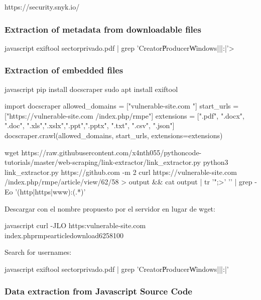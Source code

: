 \documentclass[letterpaper,12pt]{extarticle}
\begin{document}
https://security.snyk.io/



\subsubsection{Extraction of metadata from downloadable files}

\begin{sourcecode}{javascript}
exiftool sectorprivado.pdf | grep 'Creator\|Producer\|Windows|\Linux|\OS|\C:|\http'>
\end{sourcecode}

\subsubsection{Extraction of embedded files}

\begin{sourcecode}{javascript}
pip install docscraper 
sudo apt install exiftool


import docscraper 
allowed_domains = ["vulnerable-site.com "]
start_urls = ["https://vulnerable-site.com /index.php/rmpe"]
extensions = [".pdf", ".docx", ".doc", ".xls",".xslx",".ppt",".pptx", ".txt", ".csv", ".json"]
docscraper.crawl(allowed_domains, start_urls, extensions=extensions)
\end{sourcecode}

\begin{sourcecode}
wget https://raw.githubusercontent.com/x4nth055/pythoncode-tutorials/master/web-scraping/link-extractor/link_extractor.py
python3 link_extractor.py https://github.com -m 2
curl https://vulnerable-site.com /index.php/rmpe/article/view/62/58 > output && cat output | tr '";>' '\n' | grep -Eo '(http|https|www):(.*)'
\end{sourcecode}

Descargar con el nombre propuesto por el servidor en lugar de wget:
\begin{sourcecode}{javascript}
curl -JLO https:\/\/vulnerable-site.com \/index.php\/rmpe\/article\/download\/62\/58\/100
\end{sourcecode}

Search for usernames:
\begin{sourcecode}{javascript}
exiftool sectorprivado.pdf | grep 'Creator\|Producer\|Windows|\Linux|\OS|\C:|\http'
\end{sourcecode}


\subsubsection{Data extraction from Javascript Source Code}
\end{document}
